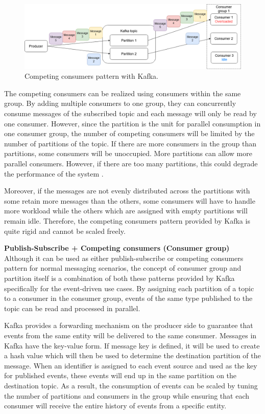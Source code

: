 \begin{figure}[h]
	\centering
	\includegraphics[width=\linewidth]{images/competing-consumers-kafka.png}
	\caption{Competing consumers pattern with Kafka.}
	\label{fig:kafkacompetingconsumer}
\end{figure}
The competing consumers can be realized using consumers within the same group. By adding multiple consumers to one group, they can concurrently consume messages of the subscribed topic and each message will only be read by one consumer. However, since the partition is the unit for parallel consumption in one consumer group, the number of competing consumers will be limited by the number of partitions of the topic. If there are more consumers in the group than partitions, some consumers will be unoccupied. More partitions can allow more parallel consumers. However, if there are too many partitions, this could degrade the performance of the system \cite{kafkapartitionsnum}.

Moreover, if the messages are not evenly distributed across the partitions with some retain more messages than the others, some consumers will have to handle more workload while the others which are assigned with empty partitions will remain idle. Therefore, the competing consumers pattern provided by Kafka is quite rigid and cannot be scaled freely.

\textbf{Publish-Subscribe + Competing consumers (Consumer group)}\\
Although it can be used as either publish-subscribe or competing consumers pattern for normal messaging scenarios, the concept of consumer group and partition itself is a combination of both these patterns provided by Kafka specifically for the event-driven use cases. By assigning each partition of a topic to a consumer in the consumer group, events of the same type published to the topic can be read and processed in parallel. 

Kafka provides a forwarding mechanism on the producer side to guarantee that events from the same entity will be delivered to the same consumer. Messages in Kafka have the key-value form. If message key is defined, it will be used to create a hash value which will then be used to determine the destination partition of the message. When an identifier is assigned to each event source and used as the key for published events, these events will end up in the same partition on the destination topic. As a result, the consumption of events can be scaled by tuning the number of partitions and consumers in the group while ensuring that each consumer will receive the entire history of events from a specific entity.  

